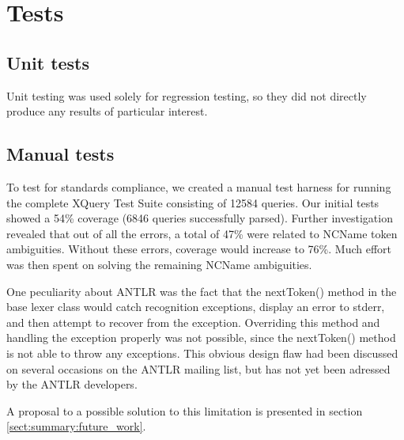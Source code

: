 \section{Tests}
\subsection{Unit tests}
Unit testing was used solely for regression testing, so they did not directly 
produce any results of particular interest.

\subsection{Manual tests}
\label{sect:tests:manual}
To test for standards compliance, we created a manual test harness for running
the complete XQuery Test Suite\cite{w3c05} consisting of 12584 queries. Our
initial tests showed a 54\% coverage (6846 queries successfully parsed). Further
investigation revealed that out of all the errors, a total of 47\% were related
to NCName token ambiguities. Without these errors, coverage would increase to
76\%. Much effort was then spent on solving the remaining NCName ambiguities.

One peculiarity about ANTLR was the fact that the nextToken() method in the base
lexer class would catch recognition exceptions, display an error to stderr, and
then attempt to recover from the exception. Overriding this method and handling
the exception properly was not possible, since the nextToken() method is not
able to throw any exceptions. This obvious design flaw had been discussed on
several occasions on the ANTLR mailing list\cite{antlrmail}, but has not yet
been adressed by the ANTLR developers.

A proposal to a possible solution to this limitation is presented in section
\ref{sect:summary:future_work}.